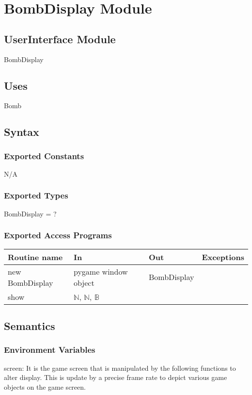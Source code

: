 \documentclass[12pt]{article}
\begin{document}
\section{BombDisplay Module}

\subsection*{UserInterface Module}
BombDisplay

\subsection*{Uses}
Bomb

\subsection*{Syntax}
\subsubsection*{Exported Constants}
N/A
\subsubsection*{Exported Types}
BombDisplay = ?
\subsubsection*{Exported Access Programs}

\begin{tabular}{| l | l | l | l |}
\hline
\textbf{Routine name} & \textbf{In} & \textbf{Out} & \textbf{Exceptions}\\
\hline
new BombDisplay       &pygame window object&     BombDisplay        &           \\
\hline
show       &	 $\mathbb{N}$, $\mathbb{N}$, $\mathbb{B}$    &           &          \\
\hline
\end{tabular}

\subsection*{Semantics}
\subsubsection*{Environment Variables}
screen: It is the game screen that is manipulated by the following functions to alter display. This is update by a precise frame rate to depict various game objects on the game screen.
\end{document}
